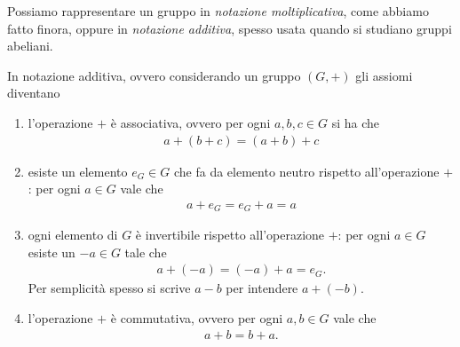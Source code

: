 Possiamo rappresentare un gruppo in \emph{notazione moltiplicativa}, come abbiamo fatto finora, oppure in \emph{notazione additiva}, spesso usata quando si studiano gruppi abeliani. 

In notazione additiva, ovvero considerando un gruppo $(G, +)$ gli assiomi diventano \begin{enumerate}[(G1)]
    \item l'operazione $+$ è associativa, ovvero per ogni $a, b, c \in G$ si ha che \begin{align*}
        a + (b + c) = (a + b) + c
    \end{align*}
    \item esiste un elemento $e_G \in G$ che fa da elemento neutro rispetto all'operazione $+$: per ogni $a \in G$ vale che \begin{align*}
        a + e_G = e_G + a = a 
    \end{align*}
    \item ogni elemento di $G$ è invertibile rispetto all'operazione $+$: per ogni $a \in G$ esiste un $-a \in G$ tale che \begin{align*}
        a + (-a) = (-a) + a = e_G.
    \end{align*}
    Per semplicità spesso si scrive $a - b$ per intendere $a + (-b)$.
    \item l'operazione $+$ è commutativa, ovvero per ogni $a, b \in G$ vale che \begin{align*}
        a + b = b + a.
    \end{align*}
\end{enumerate}

